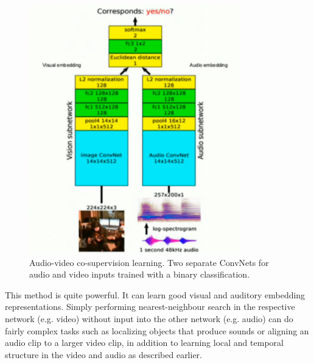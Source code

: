 \begin{figure}[H]
  \includegraphics[width=\linewidth]{lectures/13-a/audio-video.png}
    \caption{Audio-video co-supervision learning. 
    Two separate ConvNets for audio and video inputs trained with a binary classification.}
  \label{fig:audio-video}
\end{figure}

This method is quite powerful. 
It can learn good visual and auditory embedding representations. 
Simply performing nearest-neighbour search in the respective network (e.g. video) without input into the other network (e.g. audio) can do fairly complex tasks such as localizing objects that produce sounds or aligning an audio clip to a larger video clip, in addition to learning local and temporal structure in the video and audio as described earlier.

